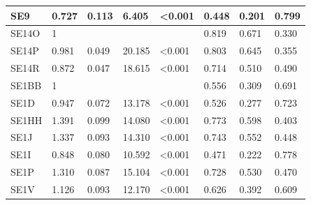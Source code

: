 \documentclass[11pt]{article}
\begin{document}
\begin{table}[h!]
{\begin{tabular}{|l|l|l|l|l|l|l|l|}
SE9             & 0.727            & 0.113                   & 6.405            & \textless 0.001    & 0.448                   &  0.201               & 0.799                        \\ \hline
%
SE14O           & 1                &                         &                  &                    & 0.819                   &  0.671               & 0.330                        \\ \hline
SE14P           & 0.981            & 0.049                   & 20.185           & \textless 0.001    & 0.803                   &  0.645               & 0.355                        \\ \hline
SE14R           & 0.872            & 0.047                   & 18.615           & \textless 0.001    & 0.714                   &  0.510               & 0.490                        \\ \hline
%
SE1BB           & 1                &                         &                  &                    & 0.556                   &  0.309               & 0.691                        \\ \hline
SE1D            & 0.947            & 0.072                   & 13.178           & \textless 0.001    & 0.526                   &  0.277               & 0.723                        \\ \hline
SE1HH           & 1.391            & 0.099                   & 14.080           & \textless 0.001    & 0.773                   &  0.598               & 0.403                        \\ \hline
SE1J            & 1.337            & 0.093                   & 14.310           & \textless 0.001    & 0.743                   &  0.552               & 0.448                        \\ \hline
SE1I            & 0.848            & 0.080                   & 10.592           & \textless 0.001    & 0.471                   &  0.222               & 0.778                        \\ \hline
SE1P            & 1.310            & 0.087                   & 15.104           & \textless 0.001    & 0.728                   &  0.530               & 0.470                        \\ \hline
SE1V            & 1.126            & 0.093                   & 12.170           & \textless 0.001    & 0.626                   &  0.392               & 0.609                        \\ \hline
\end{tabular}                                                                                                                                           
}
\end{table}
\end{document}
